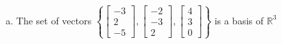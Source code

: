\begin{exerciseAnswer}
\begin{enumerate}[(a)]
\item The set of vectors \( \left\{ \left[\begin{array}{c}
-3 \\
2 \\
-5
\end{array}\right] , \left[\begin{array}{c}
-2 \\
-3 \\
2
\end{array}\right] , \left[\begin{array}{c}
4 \\
3 \\
0
\end{array}\right] \right\} \) is a basis of \(\mathbb{R}^3\)
\end{enumerate}
    
\end{exerciseAnswer}
    
